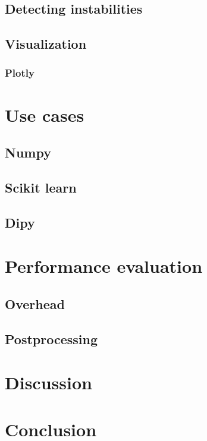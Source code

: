 \documentclass[acmconf,authordraft,anonymous,review]{acmart}
\begin{document}
\subsection{Detecting instabilities}

\subsection{Visualization}

\subsubsection{Plotly}

\section{Use cases}

\subsection{Numpy}
\subsection{Scikit learn}
\subsection{Dipy}

\section{Performance evaluation}
\subsection{Overhead}
\subsection{Postprocessing}

\section{Discussion}

\section{Conclusion}





\appendix
\end{document}
